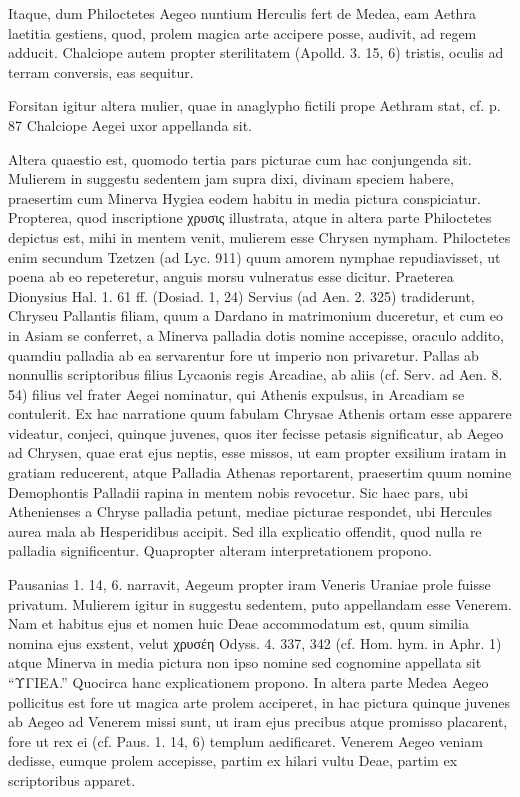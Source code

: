 \documentclass[landscape, a4paper, 11pt, oneside, polutonikogreek, german]{article}
\begin{document}
Itaque, dum Philoctetes Aegeo nuntium Herculis fert de Medea, eam Aethra laetitia gestiens, quod, prolem magica arte accipere posse, audivit, ad regem adducit. Chalciope autem propter sterilitatem (Apolld. 3. 15, 6) tristis, oculis ad terram conversis, eas sequitur.

Forsitan igitur altera mulier, quae in anaglypho fictili prope Aethram stat, cf. p. 87 Chalciope Aegei uxor appellanda sit.

Altera quaestio est, quomodo tertia pars picturae cum hac conjungenda sit. Mulierem in suggestu sedentem jam supra dixi, divinam speciem habere, praesertim cum Minerva Hygiea eodem habitu in media pictura conspiciatur. Propterea, quod inscriptione χρυσις illustrata, atque in altera parte Philoctetes depictus est, mihi in mentem venit, mulierem esse Chrysen nympham. Philoctetes enim secundum Tzetzen (ad Lyc. 911) quum amorem nymphae repudiavisset, ut poena ab eo repeteretur, anguis morsu vulneratus esse dicitur. Praeterea Dionysius Hal. 1. 61 ff. (Dosiad. 1, 24) Servius (ad Aen. 2. 325) tradiderunt, Chryseu Pallantis filiam, quum a Dardano in matrimonium duceretur, et cum eo in Asiam se conferret, a Minerva palladia dotis nomine accepisse, oraculo addito, quamdiu palladia ab ea servarentur fore ut imperio non privaretur. Pallas ab nonnullis scriptoribus filius Lycaonis regis Arcadiae, ab aliis (cf. Serv. ad Aen. 8. 54) filius vel frater Aegei nominatur, qui Athenis expulsus, in Arcadiam se contulerit. Ex hac narratione quum fabulam Chrysae Athenis ortam esse apparere videatur, conjeci, quinque juvenes, quos iter fecisse petasis significatur, ab Aegeo ad Chrysen, quae erat ejus neptis, esse missos, ut eam propter exsilium iratam in gratiam reducerent, atque Palladia Athenas reportarent, praesertim quum nomine Demophontis Palladii rapina in mentem nobis revocetur. Sic haec pars, ubi Athenienses a Chryse palladia petunt, mediae picturae respondet, ubi Hercules aurea mala ab Hesperidibus accipit. Sed illa explicatio offendit, quod nulla re palladia significentur. Quapropter alteram interpretationem propono.

Pausanias 1. 14, 6. narravit, Aegeum propter iram Veneris Uraniae prole fuisse privatum. Mulierem igitur in suggestu sedentem, puto appellandam esse Venerem. Nam et habitus ejus et nomen huic Deae accommodatum est, quum similia nomina ejus exstent, velut χρυσέη Odyss. 4. 337, 342 (cf. Hom. hym. in Aphr. 1) atque Minerva in media pictura non ipso nomine sed cognomine appellata sit "`ΥΓΙΕΑ."' Quocirca hanc explicationem propono. In altera parte Medea Aegeo pollicitus est fore ut magica arte prolem acciperet, in hac pictura quinque juvenes ab Aegeo ad Venerem missi sunt, ut iram ejus precibus atque promisso placarent, fore ut rex ei (cf. Paus. 1. 14, 6) templum aedificaret. Venerem Aegeo veniam dedisse, eumque prolem accepisse, partim ex hilari vultu Deae, partim ex scriptoribus apparet.
\clearpage
\end{document}
